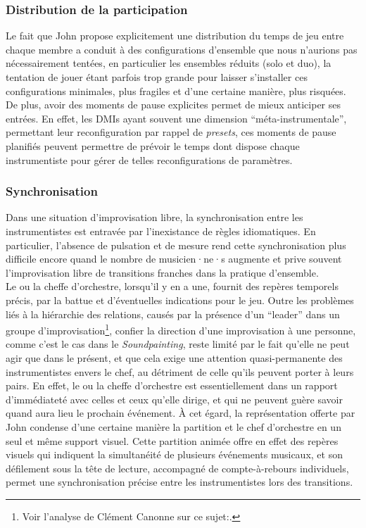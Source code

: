 \subsubsection{Distribution de la participation}

\noindent Le fait que John propose explicitement une distribution du temps de jeu entre chaque membre a conduit à des configurations d'ensemble que nous n'aurions pas nécessairement tentées, en particulier les ensembles réduits (solo et duo), la tentation de jouer étant parfois trop grande pour laisser s'installer ces configurations minimales, plus fragiles et d'une certaine manière, plus risquées.\\
\indent De plus, avoir des moments de pause explicites permet de mieux anticiper ses entrées. En effet, les \glspl{DMI} ayant souvent une dimension ``méta-instrumentale'', permettant leur reconfiguration par rappel de \textit{presets}, ces moments de pause planifiés peuvent permettre de prévoir le temps dont dispose chaque instrumentiste pour gérer de telles reconfigurations de paramètres.

\subsubsection{Synchronisation}

\noindent Dans une situation d'improvisation libre, la synchronisation entre les instrumentistes est entravée par l'inexistance de règles idiomatiques. En particulier, l'absence de pulsation et de mesure rend cette synchronisation plus difficile encore quand le nombre de musicien·ne·s augmente et prive souvent l'improvisation libre de transitions franches dans la pratique d'ensemble.\\
\indent Le ou la cheffe d'orchestre, lorsqu'il y en a une, fournit des repères temporels précis, par la battue et d'éventuelles indications pour le jeu. Outre les problèmes liés à la hiérarchie des relations, causés par la présence d'un ``leader'' dans un groupe d'improvisation\footnote{Voir l'analyse de Clément Canonne sur ce sujet:\cite{canonne_improvisation_2012}.}, confier la direction d'une improvisation à une personne, comme c'est le cas dans le \textit{Soundpainting}, reste limité par le fait qu'elle ne peut agir que dans le présent, et que cela exige une attention quasi-permanente des instrumentistes envers le chef, au détriment de celle qu'ils peuvent porter à leurs pairs. En effet, le ou la cheffe d'orchestre est essentiellement dans un rapport d'immédiateté avec celles et ceux qu'elle dirige, et qui ne peuvent guère savoir quand aura lieu le prochain événement. À cet égard, la représentation offerte par John condense d'une certaine manière la partition et le chef d'orchestre en un seul et même support visuel. Cette partition animée offre en effet des repères visuels qui indiquent la simultanéité de plusieurs événements musicaux, et son défilement sous la tête de lecture, accompagné de compte-à-rebours individuels, permet une synchronisation précise entre les instrumentistes lors des transitions.

